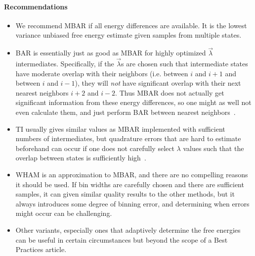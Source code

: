 \documentclass[9pt,bestpractices]{livecoms}
\begin{document}
\paragraph{Recommendations}
\begin{itemize}
\item We recommend MBAR if all energy differences are available. It is the lowest variance unbiased free energy estimate given samples from multiple states.
\item BAR is essentially just as good as MBAR for highly optimized $\vec{\lambda}$ intermediates. Specifically, if the $\vec{\lambda}$s are chosen such that intermediate states have moderate overlap with their neighbors (i.e. between $i$ and $i+1$ and between $i$ and $i-1$), they will \textit{not} have significant overlap with their next nearest neighbors $i+2$ and $i-2$. Thus MBAR does not actually get significant information from these energy differences, so one might as well not even calculate them, and just perform BAR between nearest neighbors~\cite{paliwal2011benchmark}. 
\item TI usually gives similar values as MBAR implemented with sufficient numbers of intermediates, but quadrature errors that are hard to estimate beforehand  can occur if one does not carefully select $\lambda$ values such that the overlap between states is sufficiently high~\cite{paliwal2011benchmark}.
\item WHAM is an approximation to MBAR, and there are no compelling reasons it should be used. If bin widths are carefully chosen and there are sufficient samples, it can given similar quality results to the other methods, but it always introduces some degree of binning error, and determining when errors might occur can be challenging. 
\item Other variants, especially ones that adaptively determine the free energies can be useful in certain circumstances but beyond the scope of a Best Practices article.
\end{itemize}
\end{document}
